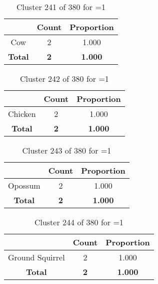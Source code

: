 \begin{table}[ht!]
\centering
\begin{tabular}{|c|c|c|}
\hline
\bf \Spec{} &\bf Count &\bf Proportion\\ \hline \hline
Cow & 2 & 1.000\\ \hline
\hline
\bf Total & \bf 2 & \bf 1.000\\ \hline
\end{tabular}
\label{tab:cluster:241:1}
\caption{Cluster 241 of 380 for \minneigh{}=1}
\end{table}

\begin{table}[ht!]
\centering
\begin{tabular}{|c|c|c|}
\hline
\bf \Spec{} &\bf Count &\bf Proportion\\ \hline \hline
Chicken & 2 & 1.000\\ \hline
\hline
\bf Total & \bf 2 & \bf 1.000\\ \hline
\end{tabular}
\label{tab:cluster:242:1}
\caption{Cluster 242 of 380 for \minneigh{}=1}
\end{table}

\begin{table}[ht!]
\centering
\begin{tabular}{|c|c|c|}
\hline
\bf \Spec{} &\bf Count &\bf Proportion\\ \hline \hline
Opossum & 2 & 1.000\\ \hline
\hline
\bf Total & \bf 2 & \bf 1.000\\ \hline
\end{tabular}
\label{tab:cluster:243:1}
\caption{Cluster 243 of 380 for \minneigh{}=1}
\end{table}

\begin{table}[ht!]
\centering
\begin{tabular}{|c|c|c|}
\hline
\bf \Spec{} &\bf Count &\bf Proportion\\ \hline \hline
Ground Squirrel & 2 & 1.000\\ \hline
\hline
\bf Total & \bf 2 & \bf 1.000\\ \hline
\end{tabular}
\label{tab:cluster:244:1}
\caption{Cluster 244 of 380 for \minneigh{}=1}
\end{table}

